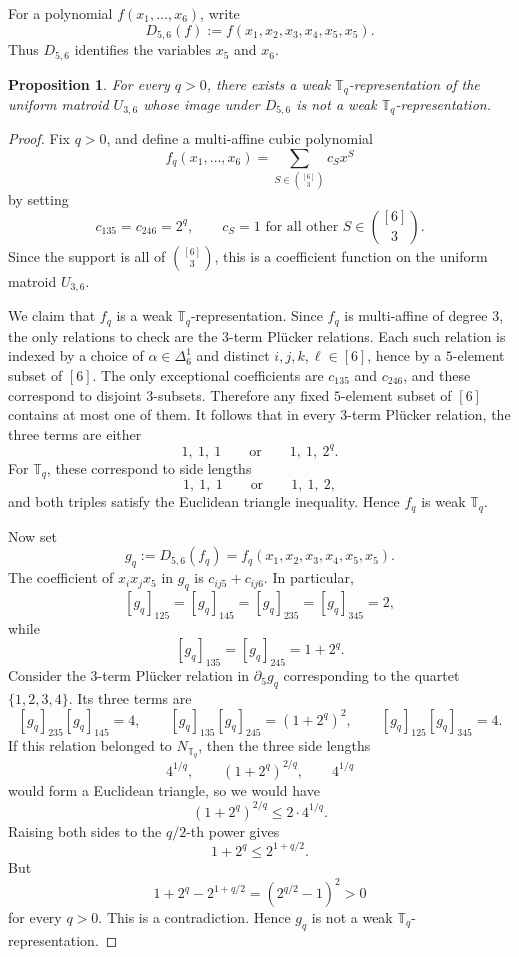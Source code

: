 \documentclass[12pt]{amsart}
\newtheorem{proposition}[theorem]{Proposition}
\theoremstyle{definition}
\newcommand{\1}{\mathbf{1}}
\newcommand\T{{\mathbb T}}
\begin{document}
For a polynomial $f(x_1,\dots,x_6)$, write
\[
D_{5,6}(f):=f(x_1,x_2,x_3,x_4,x_5,x_5).
\]
Thus $D_{5,6}$ identifies the variables $x_5$ and $x_6$.

\begin{proposition}
\label{prop:down-not-weak}
For every $q>0$, there exists a weak $\T_q$-representation of the uniform matroid
$U_{3,6}$ whose image under $D_{5,6}$ is not a weak $\T_q$-representation.
\end{proposition}

\begin{proof}
Fix $q>0$, and define a multi-affine cubic polynomial
\[
f_q(x_1,\dots,x_6)=\sum_{S\in \binom{[6]}{3}} c_S x^S
\]
by setting
\[
c_{135}=c_{246}=2^q,
\qquad
c_S=1 \text{ for all other } S\in \binom{[6]}{3}.
\]
Since the support is all of $\binom{[6]}{3}$, this is a coefficient function on the uniform
matroid $U_{3,6}$.

We claim that $f_q$ is a weak $\T_q$-representation. Since $f_q$ is multi-affine of degree
$3$, the only relations to check are the $3$-term Pl\"ucker relations. Each such relation is
indexed by a choice of $\alpha\in \Delta_6^1$ and distinct $i,j,k,\ell\in [6]$, hence by a
$5$-element subset of $[6]$. The only exceptional coefficients are $c_{135}$ and $c_{246}$,
and these correspond to disjoint $3$-subsets. Therefore any fixed $5$-element subset of
$[6]$ contains at most one of them. It follows that in every $3$-term Pl\"ucker relation,
the three terms are either
\[
1,\ 1,\ 1
\qquad\text{or}\qquad
1,\ 1,\ 2^q.
\]
For $\T_q$, these correspond to side lengths
\[
1,\ 1,\ 1
\qquad\text{or}\qquad
1,\ 1,\ 2,
\]
and both triples satisfy the Euclidean triangle inequality. Hence $f_q$ is weak $\T_q$.

Now set
\[
g_q:=D_{5,6}(f_q)=f_q(x_1,x_2,x_3,x_4,x_5,x_5).
\]
The coefficient of $x_i x_j x_5$ in $g_q$ is $c_{ij5}+c_{ij6}$. In particular,
\[
[g_q]_{125}=[g_q]_{145}=[g_q]_{235}=[g_q]_{345}=2,
\]
while
\[
[g_q]_{135}=[g_q]_{245}=1+2^q.
\]
Consider the $3$-term Pl\"ucker relation in $\partial_5 g_q$ corresponding to the quartet
$\{1,2,3,4\}$. Its three terms are
\[
[g_q]_{235}[g_q]_{145}=4,
\qquad
[g_q]_{135}[g_q]_{245}=(1+2^q)^2,
\qquad
[g_q]_{125}[g_q]_{345}=4.
\]
If this relation belonged to $N_{\T_q}$, then the three side lengths
\[
4^{1/q},\qquad (1+2^q)^{2/q},\qquad 4^{1/q}
\]
would form a Euclidean triangle, so we would have
\[
(1+2^q)^{2/q}\le 2\cdot 4^{1/q}.
\]
Raising both sides to the $q/2$-th power gives
\[
1+2^q\le 2^{1+q/2}.
\]
But
\[
1+2^q-2^{1+q/2}=(2^{q/2}-1)^2>0
\]
for every $q>0$. This is a contradiction. Hence $g_q$ is not a weak
$\T_q$-representation.
\end{proof}
\end{document}
